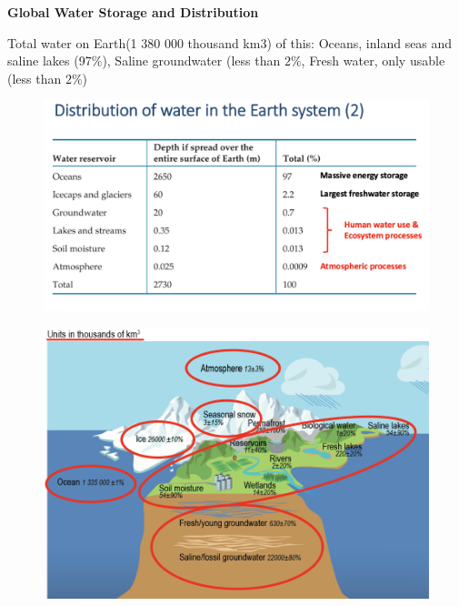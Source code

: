 \documentclass[fontsize=8pt, a4paper, landscape, fleqn]{scrartcl}
\renewcommand{\subsection}[1]{%
    \noindent\colorbox{subsectioncolor}{%
        \parbox{\dimexpr\columnwidth-2\fboxsep}{\color{white}\textbf{#1}}}%
    \vspace{0.5mm}%
}
\begin{document}
\begin{multicols*}{3}[\raggedcolumns]
\subsection{Global Water Storage and Distribution}
Total water on Earth(1 380 000 thousand km3) of this: Oceans, inland seas and saline lakes (97$\%$), Saline groundwater (less than $2\%$, Fresh water, only usable (less than $2\%$) \\
\begin{figure}[H]
    \centering
    \includegraphics[width=\linewidth]{CS/img/Dist_water.png}
\end{figure}

\begin{figure}[H]
    \centering
    \includegraphics[width=\linewidth]{CS/img/global_water_storage.png}
\end{figure}

\end{multicols*}
\end{document}
